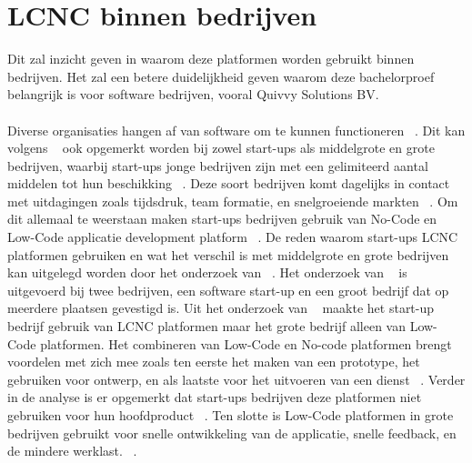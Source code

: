 \section{LCNC binnen bedrijven}
\label{sec:lcnc-bedrijven}
Dit zal inzicht geven in waarom deze platformen worden gebruikt binnen bedrijven. 
Het zal een betere duidelijkheid geven waarom deze bachelorproef belangrijk is voor software bedrijven, vooral Quivvy Solutions BV.
\\
\\
Diverse organisaties hangen af van software om te kunnen functioneren ~\autocite{Hintsch2021}. 
Dit kan volgens ~\textcite{Rafiq_2022} ook opgemerkt worden bij zowel start-ups als middelgrote en grote bedrijven, waarbij start-ups jonge bedrijven 
zijn met een gelimiteerd aantal middelen tot hun beschikking ~\autocite{Rafiq_2022}. Deze soort bedrijven komt dagelijks in contact met uitdagingen zoals tijdsdruk, 
team formatie, en snelgroeiende markten ~\autocite{Rafiq_2022}. Om dit allemaal te weerstaan maken start-ups bedrijven gebruik van No-Code en Low-Code applicatie 
development platform ~\autocite{Rafiq_2022}. De reden waarom start-ups LCNC platformen gebruiken en wat het verschil is met middelgrote en grote bedrijven kan 
uitgelegd worden door het onderzoek van ~\textcite{Rafiq_2022}. Het onderzoek van ~\textcite{Rafiq_2022} is uitgevoerd bij twee bedrijven, een software start-up en 
een groot bedrijf dat op meerdere plaatsen gevestigd is. Uit het onderzoek van ~\textcite{Rafiq_2022} maakte het start-up bedrijf gebruik van LCNC platformen maar 
het grote bedrijf alleen van Low-Code platformen. Het combineren van Low-Code en No-code platformen brengt voordelen met zich mee zoals ten eerste het maken 
van een prototype, het gebruiken voor ontwerp, en als laatste voor het uitvoeren van een dienst ~\autocite{Rafiq_2022}. Verder in de analyse is er opgemerkt dat start-ups 
bedrijven deze platformen niet gebruiken voor hun hoofdproduct ~\autocite{Rafiq_2022}. Ten slotte is Low-Code platformen in grote bedrijven gebruikt voor snelle ontwikkeling 
van de applicatie, snelle feedback, en de mindere werklast. ~\autocite{Rafiq_2022}.
